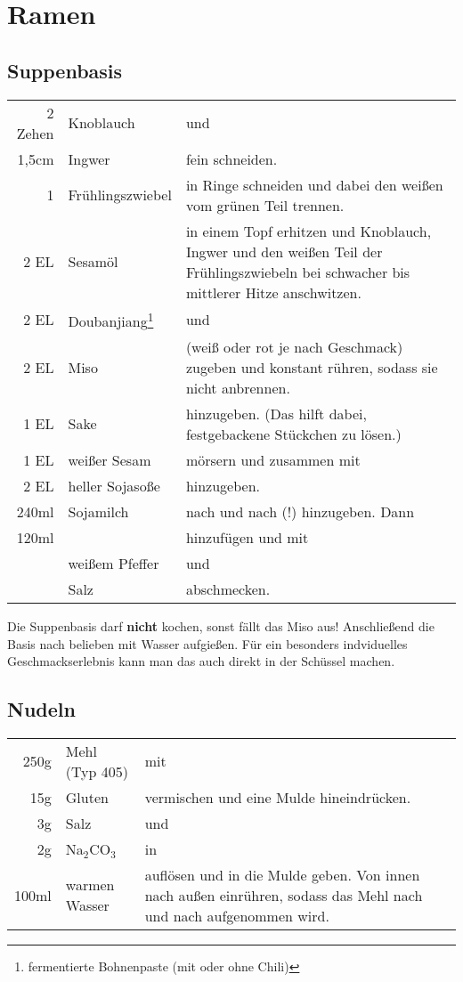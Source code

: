 \section{Ramen}\label{sec:ramen}
\subsection*{Suppenbasis}\label{subsec:ramen_soup}
\begin{longtable}{rlL{16.2cm}}
	2 Zehen	&	Knoblauch			&	und	\\
	1,5cm	&	Ingwer				&	fein schneiden.	\\
	1		&	Frühlingszwiebel	&	in Ringe schneiden und dabei den weißen vom grünen Teil trennen.	\\
	2 EL	&	Sesamöl				&	in einem Topf erhitzen und	Knoblauch, Ingwer und den weißen Teil der Frühlingszwiebeln bei schwacher bis mittlerer Hitze anschwitzen.	\\
	2 EL	&	Doubanjiang\footnote{fermentierte Bohnenpaste (mit oder ohne Chili)}	&	und \\
	2 EL	&	Miso				&	(weiß oder rot je nach Geschmack) zugeben und konstant rühren, sodass sie nicht anbrennen.	\\
	1 EL	&	Sake				&	hinzugeben. (Das hilft dabei, festgebackene Stückchen zu lösen.)	\\
	1 EL	&	weißer Sesam		&	mörsern und zusammen mit	\\
	2 EL	&	heller Sojasoße		&	hinzugeben.	\\
	240ml	&	Sojamilch			&	nach und nach (!) hinzugeben.
										Dann	\\
	120ml	&			&	hinzufügen und mit	\\
			&	weißem Pfeffer		&	und	\\
			&	Salz				&	abschmecken.	\\
\end{longtable}
Die Suppenbasis darf \textbf{nicht} kochen, sonst fällt das Miso aus!
Anschließend die Basis nach belieben mit Wasser aufgießen.
Für ein besonders indviduelles Geschmackserlebnis kann man das auch direkt in der Schüssel machen.
\subsection*{Nudeln}\label{subsec:ramen_noodles}
\begin{longtable}{rlL{16.7cm}}
	250g	&	Mehl (Typ 405)	&	mit \\
	15g		&	Gluten			&	vermischen und eine Mulde hineindrücken. \\
	3g		&	Salz			&	und \\
	2g		&	Na$_2$CO$_3$	&	in \\
	100ml	&	warmen Wasser	&	auflösen und in die Mulde geben.
									Von innen nach außen einrühren, sodass das Mehl nach und nach aufgenommen wird. \\
\end{longtable}


